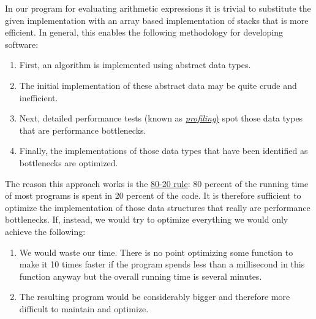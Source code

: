 \begin{enumerate}
       In our program for evaluating  arithmetic expressions it is trivial to substitute the given
       implementation with an array based implementation of stacks that is more efficient.  In general,
       this enables the following methodology for developing software:  
       \begin{enumerate}
       \item First, an algorithm is implemented using abstract data types.
       \item The initial implementation of these abstract data may be quite crude and inefficient.
       \item Next, detailed performance tests (known as 
             \href{http://en.wikipedia.org/wiki/Profiling_(computer_programming)}{\emph{profiling})}
             spot those data types that are performance bottlenecks.
       \item Finally, the implementations of those data types that have been identified as bottlenecks are optimized.
       \end{enumerate}
       The reason this approach works is the 
       \href{http://en.wikipedia.org/wiki/Pareto_principle#In_software}{80-20 rule}:  
       80 percent of the running time of most programs is spent in 20 percent of the code.  It is
       therefore sufficient to optimize the 
       implementation of those data structures that really are performance bottlenecks.  If,
       instead, we would try to optimize everything we would only achieve the following:
       \begin{enumerate}
       \item We would waste our time.  There is no point optimizing some function to make it 10 times
             faster if the program spends less than a millisecond in this function anyway but the
             overall running time is several minutes.
       \item The resulting program would be considerably bigger and therefore more difficult to 
             maintain and optimize.
       \end{enumerate}
 \end{enumerate}




